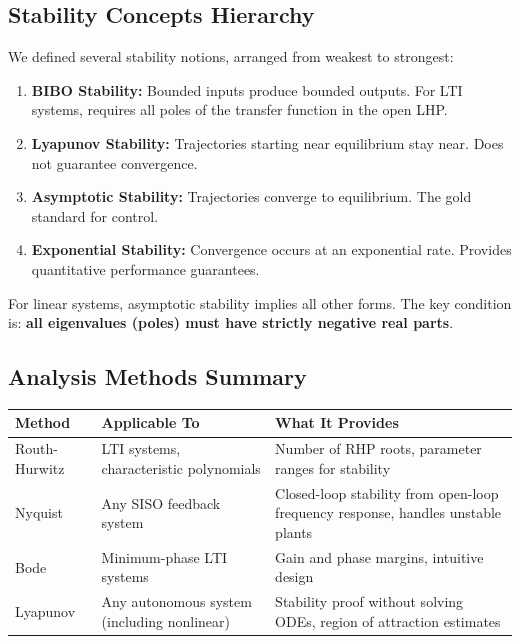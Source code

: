 \subsection{Stability Concepts Hierarchy}

We defined several stability notions, arranged from weakest to strongest:

\begin{enumerate}
    \item \textbf{BIBO Stability:} Bounded inputs produce bounded outputs. For LTI systems, requires all poles of the transfer function in the open LHP.

    \item \textbf{Lyapunov Stability:} Trajectories starting near equilibrium stay near. Does not guarantee convergence.

    \item \textbf{Asymptotic Stability:} Trajectories converge to equilibrium. The gold standard for control.

    \item \textbf{Exponential Stability:} Convergence occurs at an exponential rate. Provides quantitative performance guarantees.
\end{enumerate}

For linear systems, asymptotic stability implies all other forms. The key condition is: \textbf{all eigenvalues (poles) must have strictly negative real parts}.

\subsection{Analysis Methods Summary}

\begin{center}
\begin{tabular}{p{3cm}p{4cm}p{5cm}}
\toprule
\textbf{Method} & \textbf{Applicable To} & \textbf{What It Provides} \\
\midrule
Routh-Hurwitz & LTI systems, characteristic polynomials & Number of RHP roots, parameter ranges for stability \\
\addlinespace
Nyquist & Any SISO feedback system & Closed-loop stability from open-loop frequency response, handles unstable plants \\
\addlinespace
Bode & Minimum-phase LTI systems & Gain and phase margins, intuitive design \\
\addlinespace
Lyapunov & Any autonomous system (including nonlinear) & Stability proof without solving ODEs, region of attraction estimates \\
\bottomrule
\end{tabular}
\end{center}


